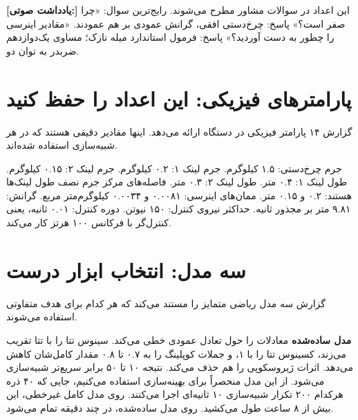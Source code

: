 \documentclass[12pt, a4paper]{article}
\newcommand{\dash}{\lr{---}}
\begin{document}

\begin{mdframed}[
  backgroundcolor=audiotan,
  linecolor=audionote!70,
  linewidth=1pt,
  innerleftmargin=12pt,
  innerrightmargin=12pt,
  innertopmargin=8pt,
  innerbottommargin=8pt
]
\textbf{\color{audionote}[يادداشت صوتی:]}
اين اعداد در سوالات مشاور مطرح می‌شوند. رايج‌ترين سوال: «چرا  صفر است؟» پاسخ: چرخ‌دستی افقی، گرانش عمودی \dash{} بر هم عمودند. «مقادير اينرسی را چطور به دست آورديد؟» پاسخ: فرمول استاندارد ميله نازک؛  مساوی يک‌دوازدهم  ضربدر  به توان دو.
\end{mdframed}

\vspace{0.6cm}

\section{پارامترهای فيزيکی: اين اعداد را حفظ کنيد}

گزارش ۱۴ پارامتر فيزيکی در دستگاه  ارائه می‌دهد. اينها مقادير دقيقی هستند که در هر شبيه‌سازی استفاده شده‌اند.

جرم چرخ‌دستی: ۱.۵ کيلوگرم. جرم لينک ۱: ۰.۲ کيلوگرم. جرم لينک ۲: ۰.۱۵ کيلوگرم. طول لينک ۱: ۰.۴ متر. طول لينک ۲: ۰.۳ متر. فاصله‌های مرکز جرم نصف طول لينک‌ها هستند: ۰.۲ و ۰.۱۵ متر. ممان‌های اينرسی: ۰.۰۰۸۱ و ۰.۰۰۳۴ کيلوگرم‌متر مربع. گرانش: ۹.۸۱ متر بر مجذور ثانيه. حداکثر نيروی کنترل: ۱۵۰ نيوتن. دوره کنترل: ۰.۰۱ ثانيه، يعنی کنترل‌گر با فرکانس ۱۰۰ هرتز کار می‌کند.

\section{سه مدل: انتخاب ابزار درست}

گزارش سه مدل رياضی متمايز را مستند می‌کند که هر کدام برای هدف متفاوتی استفاده می‌شوند.

\textbf{مدل ساده‌شده} معادلات را حول تعادل عمودی خطی می‌کند. سينوس تتا را با تتا تقريب می‌زند، کسينوس تتا را با ۱، و جملات کوپلينگ را به ۰.۷ تا ۰.۸ مقدار کامل‌شان کاهش می‌دهد. اثرات ژيروسکوپی را هم حذف می‌کند. نتيجه ۱۰ تا ۵۰ برابر سريع‌تر شبيه‌سازی می‌شود. از اين مدل منحصراً برای بهينه‌سازی  استفاده می‌کنيم، جايی که ۴۰ ذره هرکدام ۲۰۰ تکرار شبيه‌سازی ۱۰ ثانيه‌ای اجرا می‌کنند. روی مدل کامل غيرخطی، اين بيش از ۸ ساعت طول می‌کشيد. روی مدل ساده‌شده، در چند دقيقه تمام می‌شود.
\end{document}
